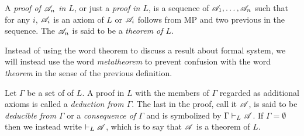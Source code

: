 \begin{definition}
  A \textit{proof of \(\mathscr{A}_n\) in \(L\)}, or just a \textit{proof in \(L\)}, is a sequence of \wfs{} \(\mathscr{A}_1, \dots, \mathscr{A}_n\) such that for any \(i\), \(\mathscr{A}_i\) is an axiom of \(L\) or \(\mathscr{A}_i\) follows from MP and two previous \wfs{} in the sequence. The \wf{} \(\mathscr{A}_n\) is said to be a \textit{theorem of \(L\)}.
\end{definition}

Instead of using the word theorem to discuss a result about formal system, we will instead use the word \textit{metatheorem} to prevent confusion with the word \textit{theorem} in the sense of the previous definition.

\setcounter{definition}{4}
\begin{definition}
  Let \(\Gamma\) be a set of \wfs{} of \(L\). A proof in \(L\) with the members of \(\Gamma\) regarded as additional axioms is called a \textit{deduction from \(\Gamma\)}. The last \wf{} in the proof, call it \(\mathscr{A}\), is said to be \textit{deducible from \(\Gamma\)} or a \textit{consequence of \(\Gamma\)} and is symbolized by \(\Gamma \vdash_{L} \mathscr{A}\). If \(\Gamma = \emptyset\) then we instead write \(\vdash_{L} \mathscr{A}\), which is to say that \(\mathscr{A}\) is a theorem of \(L\).
\end{definition}

